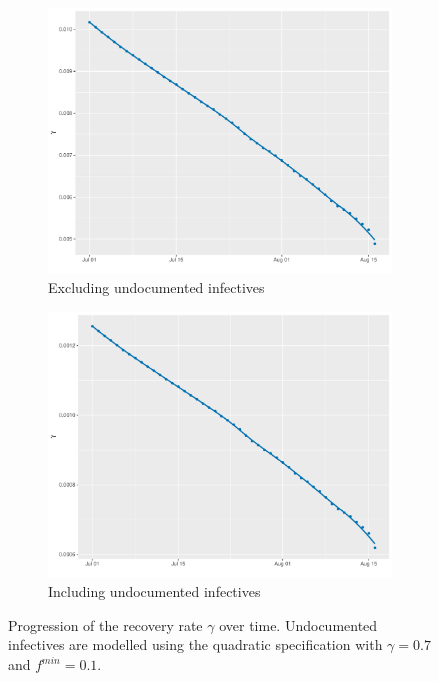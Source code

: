 \documentclass[12pt]{article}
\begin{document}
\begin{appendices}
		\begin{figure}[H]
    	    \centering
    	    \begin{subfigure}{0.495\textwidth}
    	      \centering
    	      \includegraphics[width=\linewidth]{output/panel_data_lag14_gammas_rolling.pdf}
    	      \caption{Excluding undocumented infectives}
    	      \label{fig:gamma_over_time_panel_data}
    	    \end{subfigure}
    	    \begin{subfigure}{0.495\textwidth}
    	      \centering
    	      \includegraphics[width=\linewidth]{output/panel_data_lag14_gammas_UndocQuadratic_rolling.pdf}
    	      \caption{Including undocumented infectives}
    	      \label{fig:gamma_over_time_panel_data_undoc_rolling}
    	    \end{subfigure}
    	    \caption{Progression of the recovery rate $\gamma$ over time. Undocumented infectives are modelled using the quadratic specification with $\gamma = 0.7$ and $f^{min}=0.1$.}
    	    \label{fig:gamma_over_time_panel_data_all}
    	\end{figure}
		

\end{appendices}
\end{document}
